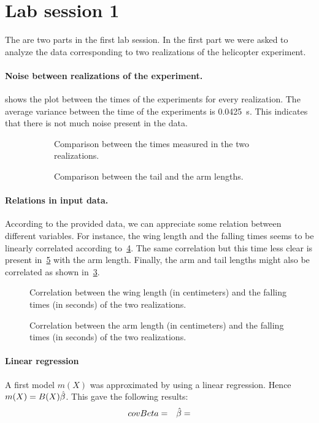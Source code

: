 \section{Lab session 1}

The are two parts in the first lab session. In the first part we were asked to
analyze the data corresponding to two realizations of the helicopter experiment.
\paragraph{Noise between realizations of the experiment.}

 shows the plot between the times of the experiments for every
realization. The average variance between the time of the experiments is
\SI{0.0425}{\second}. This indicates that there is not much noise present in the
data.

\begin{figure}
  \begin{subfigure}[h]{.5\linewidth}
    
    \caption{Comparison between the times measured in the two realizations.}
    \label{fig_t1t2}
  \end{subfigure}
  \begin{subfigure}[h]{.5\linewidth}
    
    \caption{Comparison between the tail and the arm lengths.}
    \label{fig_tl_al}
  \end{subfigure}
  \caption{}
\end{figure}

\paragraph{Relations in input data.}
According to the provided data, we can appreciate some relation between
different variables. For instance, the wing length and the falling times seems
to be linearly correlated according to~\cref{fig_wl_times}. The same correlation
but this time less clear is present in~\cref{fig_al_times} with the arm length.
Finally, the arm and tail lengths might also be correlated as shown
in~\cref{fig_tl_al}.
\begin{figure}
  \centering
  
  \caption{Correlation between the wing length (in centimeters) and the falling
  times (in seconds) of the two realizations.}
  \label{fig_wl_times}
\end{figure}

\begin{figure}
  \centering
  
  \caption{Correlation between the arm length (in centimeters) and the falling
  times (in seconds) of the two realizations.}
  \label{fig_al_times}
\end{figure}

\paragraph{Linear regression}
A first model $m(X)$ was approximated by using a linear regression. Hence $m(X)
= B(X)\hat{\beta}$. This gave the following results:
\begin{align*}
  covBeta =  &  
  &\hat{\beta} = 
\end{align*}